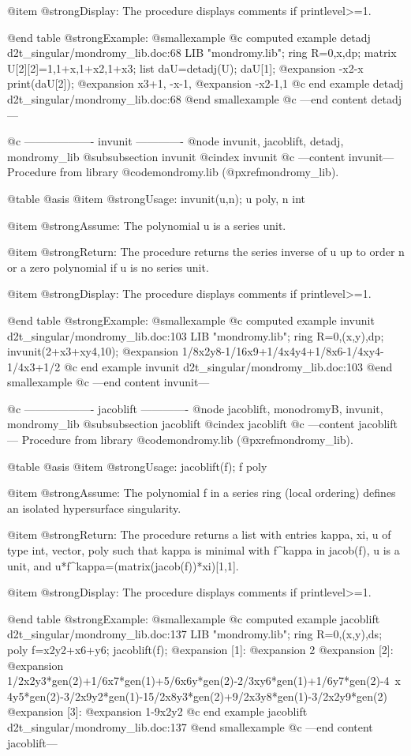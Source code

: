 @item @strong{Display:}
The procedure displays comments if printlevel>=1.

@end table
@strong{Example:}
@smallexample
@c computed example detadj d2t_singular/mondromy_lib.doc:68 
LIB "mondromy.lib";
ring R=0,x,dp;
matrix U[2][2]=1,1+x,1+x2,1+x3;
list daU=detadj(U);
daU[1];
@expansion{} -x2-x
print(daU[2]);
@expansion{} x3+1, -x-1,
@expansion{} -x2-1,1    
@c end example detadj d2t_singular/mondromy_lib.doc:68
@end smallexample
@c ---end content detadj---

@c ------------------- invunit -------------
@node invunit, jacoblift, detadj, mondromy_lib
@subsubsection invunit
@cindex invunit
@c ---content invunit---
Procedure from library @code{mondromy.lib} (@pxref{mondromy_lib}).

@table @asis
@item @strong{Usage:}
invunit(u,n); u poly, n int

@item @strong{Assume:}
The polynomial u is a series unit.

@item @strong{Return:}
The procedure returns the series inverse of u up to order n
or a zero polynomial if u is no series unit.

@item @strong{Display:}
The procedure displays comments if printlevel>=1.

@end table
@strong{Example:}
@smallexample
@c computed example invunit d2t_singular/mondromy_lib.doc:103 
LIB "mondromy.lib";
ring R=0,(x,y),dp;
invunit(2+x3+xy4,10);
@expansion{} 1/8x2y8-1/16x9+1/4x4y4+1/8x6-1/4xy4-1/4x3+1/2
@c end example invunit d2t_singular/mondromy_lib.doc:103
@end smallexample
@c ---end content invunit---

@c ------------------- jacoblift -------------
@node jacoblift, monodromyB, invunit, mondromy_lib
@subsubsection jacoblift
@cindex jacoblift
@c ---content jacoblift---
Procedure from library @code{mondromy.lib} (@pxref{mondromy_lib}).

@table @asis
@item @strong{Usage:}
jacoblift(f); f poly

@item @strong{Assume:}
The polynomial f in a series ring (local ordering) defines
an isolated hypersurface singularity.

@item @strong{Return:}
The procedure returns a list with entries kappa, xi, u of type
int, vector, poly such that kappa is minimal with f^kappa in jacob(f),
u is a unit, and u*f^kappa=(matrix(jacob(f))*xi)[1,1].

@item @strong{Display:}
The procedure displays comments if printlevel>=1.

@end table
@strong{Example:}
@smallexample
@c computed example jacoblift d2t_singular/mondromy_lib.doc:137 
LIB "mondromy.lib";
ring R=0,(x,y),ds;
poly f=x2y2+x6+y6;
jacoblift(f);
@expansion{} [1]:
@expansion{}    2
@expansion{} [2]:
@expansion{}    1/2x2y3*gen(2)+1/6x7*gen(1)+5/6x6y*gen(2)-2/3xy6*gen(1)+1/6y7*gen(2)-4\
   x4y5*gen(2)-3/2x9y2*gen(1)-15/2x8y3*gen(2)+9/2x3y8*gen(1)-3/2x2y9*gen(2)
@expansion{} [3]:
@expansion{}    1-9x2y2
@c end example jacoblift d2t_singular/mondromy_lib.doc:137
@end smallexample
@c ---end content jacoblift---


